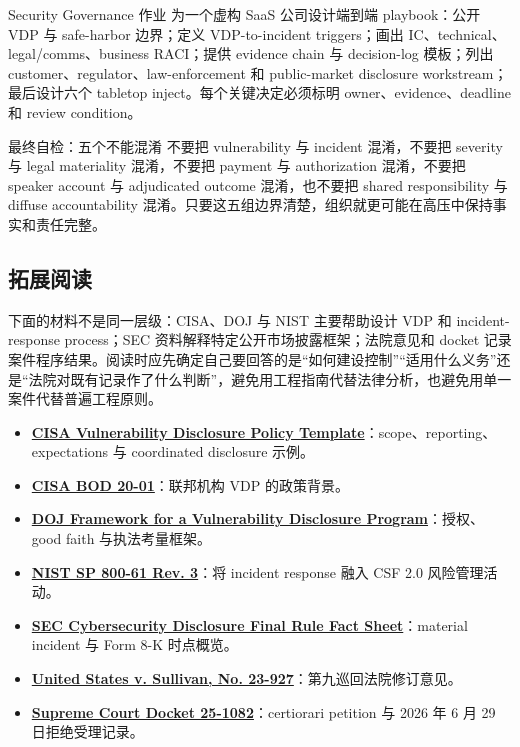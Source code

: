 \documentclass[a4paper]{article}
\begin{document}
\begin{importantbox}{Security Governance 作业}
为一个虚构 SaaS 公司设计端到端 playbook：公开 VDP 与 safe-harbor 边界；定义 VDP-to-incident triggers；画出 IC、technical、legal/comms、business RACI；提供 evidence chain 与 decision-log 模板；列出 customer、regulator、law-enforcement 和 public-market disclosure workstream；最后设计六个 tabletop inject。每个关键决定必须标明 owner、evidence、deadline 和 review condition。
\end{importantbox}

\begin{knowledgebox}{最终自检：五个不能混淆}
不要把 vulnerability 与 incident 混淆，不要把 severity 与 legal materiality 混淆，不要把 payment 与 authorization 混淆，不要把 speaker account 与 adjudicated outcome 混淆，也不要把 shared responsibility 与 diffuse accountability 混淆。只要这五组边界清楚，组织就更可能在高压中保持事实和责任完整。
\end{knowledgebox}

\subsection{拓展阅读}

下面的材料不是同一层级：CISA、DOJ 与 NIST 主要帮助设计 VDP 和 incident-response process；SEC 资料解释特定公开市场披露框架；法院意见和 docket 记录案件程序结果。阅读时应先确定自己要回答的是“如何建设控制”“适用什么义务”还是“法院对既有记录作了什么判断”，避免用工程指南代替法律分析，也避免用单一案件代替普遍工程原则。

{\small
\begin{itemize}[nosep,leftmargin=*]
  \item \href{https://www.cisa.gov/vulnerability-disclosure-policy-template}{\textbf{CISA Vulnerability Disclosure Policy Template}}：scope、reporting、expectations 与 coordinated disclosure 示例。
  \item \href{https://www.cisa.gov/news-events/directives/bod-20-01-develop-and-publish-vulnerability-disclosure-policy}{\textbf{CISA BOD 20-01}}：联邦机构 VDP 的政策背景。
  \item \href{https://www.justice.gov/criminal/criminal-ccips/page/file/983996/dl}{\textbf{DOJ Framework for a Vulnerability Disclosure Program}}：授权、good faith 与执法考量框架。
  \item \href{https://csrc.nist.gov/pubs/sp/800/61/r3/final}{\textbf{NIST SP 800-61 Rev. 3}}：将 incident response 融入 CSF 2.0 风险管理活动。
  \item \href{https://www.sec.gov/files/33-11216-fact-sheet.pdf}{\textbf{SEC Cybersecurity Disclosure Final Rule Fact Sheet}}：material incident 与 Form 8-K 时点概览。
  \item \href{https://cdn.ca9.uscourts.gov/datastore/opinions/2025/11/12/23-927.pdf}{\textbf{United States v. Sullivan, No. 23-927}}：第九巡回法院修订意见。
  \item \href{https://www.supremecourt.gov/docket/docketfiles/html/public/25-1082.html}{\textbf{Supreme Court Docket 25-1082}}：certiorari petition 与 2026 年 6 月 29 日拒绝受理记录。
\end{itemize}
}
\end{document}
